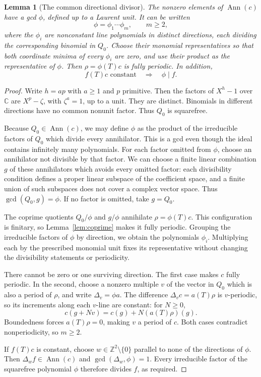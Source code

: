\documentclass[11pt]{article}
\numberwithin{equation}{section}
\newtheorem{lemma}[theorem]{Lemma}
\theoremstyle{definition}
\theoremstyle{remark}
\newcommand{\Z}{\mathbb Z}
\newcommand{\C}{\mathbb C}
\newcommand{\Ann}{\operatorname{Ann}}
\newcommand{\Del}[1]{\Delta_{#1}}
\begin{document}
\begin{lemma}[The common directional divisor]\label{lem:gcd}
The nonzero elements of $\Ann(c)$ have a gcd $\phi$, defined up to a Laurent unit. It can be written
\[
 \phi=\phi_1\cdots\phi_m,\qquad m\ge2,
\]
where the $\phi_i$ are nonconstant line polynomials in distinct directions, each dividing the
corresponding binomial in $Q_0$. Choose their monomial representatives so that both coordinate
minima of every $\phi_i$ are zero, and use their product as the representative of $\phi$. Then
$\rho=\phi(T)c$ is fully periodic. In addition,
\[
 f(T)c\text{ constant}\quad\Longrightarrow\quad \phi\mid f.
\]
\end{lemma}
\begin{proof}
Write $h=ap$ with $a\ge1$ and $p$ primitive. Then the factors of $X^h-1$ over $\C$ are $X^p-\zeta$,
with $\zeta^a=1$, up to a unit. They are distinct. Binomials in different directions have no common
nonunit factor. Thus $Q_0$ is squarefree.

Because $Q_0\in\Ann(c)$, we may define $\phi$ as the product of the irreducible factors of $Q_0$
which divide every annihilator. This is a gcd even though the ideal contains infinitely many
polynomials. For each factor omitted from $\phi$, choose an annihilator not divisible by that
factor. We can choose a finite linear combination $g$ of these annihilators which avoids every
omitted factor: each divisibility condition defines a proper linear subspace of the coefficient
space, and a finite union of such subspaces does not cover a complex vector space. Thus
$\gcd(Q_0,g)=\phi$. If no factor is omitted, take $g=Q_0$.

The coprime quotients $Q_0/\phi$ and $g/\phi$ annihilate $\rho=\phi(T)c$. This configuration is
finitary, so Lemma~\ref{lem:coprime} makes it fully periodic. Grouping the irreducible factors of
$\phi$ by direction, we obtain the polynomials $\phi_i$. Multiplying each by the prescribed monomial unit
fixes its representative without changing the divisibility statements or periodicity.

There cannot be zero or one surviving direction. The first case makes $c$ fully periodic. In the
second, choose a nonzero multiple $v$ of the vector in $Q_0$ which is also a period of $\rho$, and
write $\Del v=\phi a$. The difference $\Del v c=a(T)\rho$ is $v$-periodic, so its increments along
each $v$-line are constant: for $N\ge0$,
\[
 c(g+Nv)=c(g)+N(a(T)\rho)(g).
\]
Boundedness forces $a(T)\rho=0$, making $v$ a period of $c$. Both cases contradict nonperiodicity, so $m\ge2$.

If $f(T)c$ is constant, choose $w\in\Z^2\setminus\{0\}$ parallel to none of the directions of $\phi$. Then $\Del w
f\in\Ann(c)$ and $\gcd(\Del w,\phi)=1$. Every irreducible factor of the squarefree polynomial $\phi$
therefore divides $f$, as required.
\end{proof}
\end{document}
